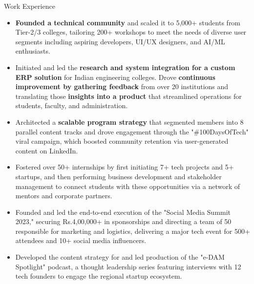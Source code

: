 \documentclass{resume} %
\begin{document}
\begin{rSection}{Work Experience}
\begin{rSubsection}
\begin{itemize}[left=-1.5em, labelsep=.1cm, labelwidth=.2cm, itemsep=0.0em]
\item \textbf{Founded a technical community }and scaled it to 5,000+ students from Tier-2/3 colleges, tailoring 200+ workshops to meet the needs of diverse user segments including aspiring developers, UI/UX designers, and AI/ML enthusiasts.
\item Initiated and led the \textbf{research and system integration for a custom ERP solution} for Indian engineering colleges. Drove \textbf{continuous improvement by gathering feedback} from over 20 institutions and translating those \textbf{insights into a product} that streamlined operations for students, faculty, and administration.
\item Architected a \textbf{scalable program strategy }that segmented members into 8 parallel content tracks and drove engagement through the "\#100DaysOfTech" viral campaign, which boosted community retention via user-generated content on LinkedIn.
\item Fostered over 50+ internships by first initiating 7+ tech projects and 5+ startups, and then performing business development and stakeholder management to connect students with these opportunities via a network of mentors and corporate partners.
\item Founded and led the end-to-end execution of the "Social Media Summit 2023," securing Rs.4,00,000+ in sponsorships and directing a team of 50 responsible for marketing and logistics, delivering a major tech event for 500+ attendees and 10+ social media influencers.
\item Developed the content strategy for and led production of the "e-DAM Spotlight" podcast, a thought leadership series featuring interviews with 12 tech founders to engage the regional startup ecosystem.
\end{itemize}

\end{rSubsection}


\end{rSection}
\vspace{0.25em}
\end{document}
